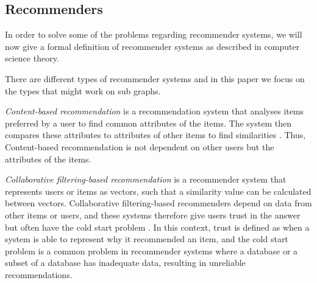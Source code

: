 \subsection{Recommenders}
\label{recommenders}
In order to solve some of the problems regarding recommender systems, we will now give a formal definition of recommender systems as described in computer science theory.

There are different types of recommender systems and in this paper we focus on the types that might work on sub graphs.

\textit{Content-based recommendation} is a recommendation system that analyses items preferred by a user to find common attributes of the items. The system then compares these attributes to attributes of other items to find similarities \cite{lu2015recommender}. Thus, Content-based recommendation is not dependent on other users but the attributes of the items.

\textit{Collaborative filtering-based recommendation} is a recommender system that represents users or items as vectors, such that a similarity value can be calculated between vectors. Collaborative filtering-based recommenders depend on data from other items or users, and these systems therefore give users trust in the answer but often have the cold start problem \cite{lu2015recommender}. In this context, trust is defined as when a system is able to represent why it recommended an item, and the cold start problem is a common problem in recommender systems where a database or a subset of a database has inadequate data, resulting in unreliable recommendations\cite{Ricci2015}.
